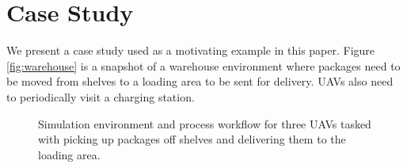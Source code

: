 \section{Case Study} \label{sec:casestudy}
We present a case study used as a motivating example in this paper. Figure \ref{fig:warehouse} is a snapshot of a warehouse environment where packages need to be moved from shelves to a loading area to be sent for delivery. UAVs also need to periodically visit a charging station. 
\begin{figure}
\centering
{}
\hfill
{}
\caption{Simulation environment and process workflow for three UAVs tasked with picking up packages off shelves and delivering them to the loading area.}
\label{fig:casestudy}
\end{figure}

